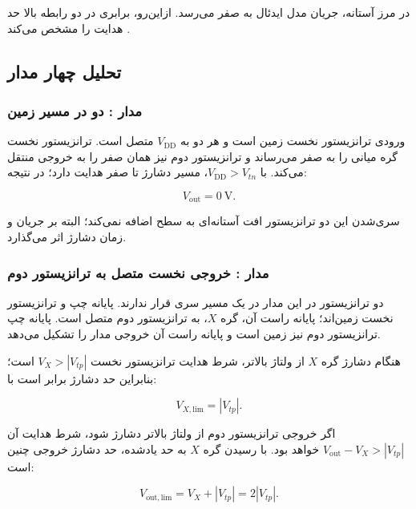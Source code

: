 در مرز آستانه، جریان مدل ایدئال به صفر می‌رسد. ازاین‌رو، برابری در دو رابطه بالا حد هدایت را مشخص می‌کند \cite[صفحات چاپی ۹۲ و ۹۳]{weste}.

\clearpage
\subsection*{تحلیل چهار مدار}

\subsubsection*{مدار : دو  در مسیر زمین}

ورودی ترانزیستور نخست زمین است و  هر دو  به \(V_{\mathrm{DD}}\) متصل است. ترانزیستور نخست گره میانی را به صفر می‌رساند و ترانزیستور دوم نیز همان صفر را به خروجی منتقل می‌کند. با \(V_{\mathrm{DD}}>V_{tn}\)، مسیر دشارژ تا صفر هدایت دارد؛ در نتیجه:

\nopagebreak[3]
\begin{equation}\label{eq:ex20-3}
\boxed{V_{\mathrm{out}}=\qty{0}{\volt}}.
\end{equation}

سری‌شدن این دو ترانزیستور افت آستانه‌ای به سطح  اضافه نمی‌کند؛ البته بر جریان و زمان دشارژ اثر می‌گذارد.

\subsubsection*{مدار : خروجی  نخست متصل به  ترانزیستور دوم}

دو ترانزیستور در این مدار در یک مسیر  سری قرار ندارند. پایانه چپ و  ترانزیستور نخست زمین‌اند؛ پایانه راست آن، گره \(X\)، به  ترانزیستور دوم متصل است. پایانه چپ ترانزیستور دوم نیز زمین است و پایانه راست آن خروجی مدار را تشکیل می‌دهد.

هنگام دشارژ گره \(X\) از ولتاژ بالاتر، شرط هدایت ترانزیستور نخست \(V_X>|V_{tp}|\) است؛ بنابراین حد دشارژ برابر است با:

\nopagebreak[3]
\begin{equation}\label{eq:ex20-4}
V_{X,\mathrm{lim}}=|V_{tp}|.
\end{equation}

اگر خروجی ترانزیستور دوم از ولتاژ بالاتر دشارژ شود، شرط هدایت آن \(V_{\mathrm{out}}-V_X>|V_{tp}|\) خواهد بود. با رسیدن گره \(X\) به حد یادشده، حد دشارژ خروجی چنین است:

\nopagebreak[3]
\begin{equation}\label{eq:ex20-5}
\boxed{V_{\mathrm{out,lim}}=V_X+|V_{tp}|=2|V_{tp}|}.
\end{equation}

